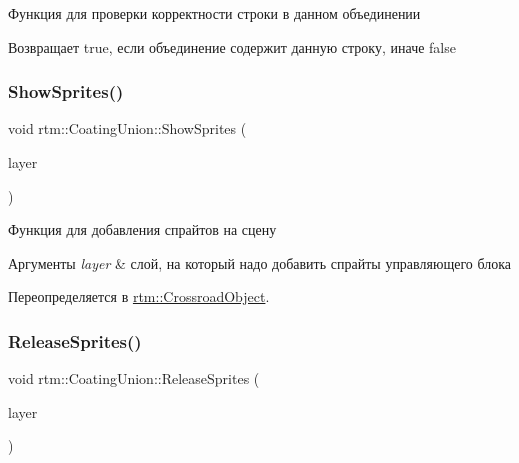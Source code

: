 Функция для проверки корректности строки в данном объединении 

\begin{DoxyReturn}{Возвращает}
true, если объединение содержит данную строку, иначе false 
\end{DoxyReturn}
\mbox{\label{classrtm_1_1_coating_union_ae95be187677aec759723edb4d14b35c1}} 
\subsubsection{\texorpdfstring{Show\+Sprites()}{ShowSprites()}}
{\footnotesize\ttfamily void rtm\+::\+Coating\+Union\+::\+Show\+Sprites (\begin{DoxyParamCaption}\item[{cocos2d\+::\+Layer $\ast$const}]{layer }\end{DoxyParamCaption})\hspace{0.3cm}{\ttfamily [virtual]}}



Функция для добавления спрайтов на сцену 


\begin{DoxyParams}{Аргументы}
{\em layer} & слой, на который надо добавить спрайты управляющего блока \\
\hline
\end{DoxyParams}


Переопределяется в \hyperlink{classrtm_1_1_crossroad_object_a2de2a5dac2ba2ca573cfa65a2633de9b}{rtm\+::\+Crossroad\+Object}.

\mbox{\label{classrtm_1_1_coating_union_a4e046aae25ce91da0408ac31a0de4e21}} 
\subsubsection{\texorpdfstring{Release\+Sprites()}{ReleaseSprites()}}
{\footnotesize\ttfamily void rtm\+::\+Coating\+Union\+::\+Release\+Sprites (\begin{DoxyParamCaption}\item[{cocos2d\+::\+Layer $\ast$const}]{layer }\end{DoxyParamCaption})\hspace{0.3cm}{\ttfamily [virtual]}}




